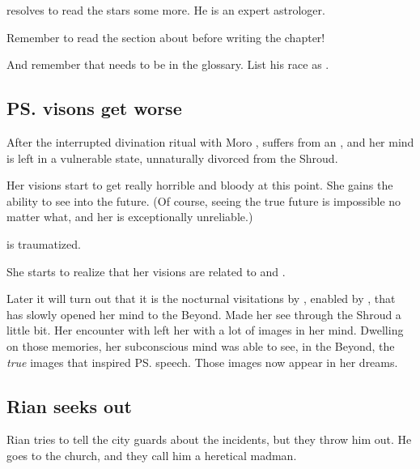 \Nasshikerr{} resolves to read the stars some more. 
He is an expert astrologer. 

Remember to read the section about  before writing the chapter!

And remember that \Nasshikerr{} needs to be in the glossary. 
List his race as \quo{\Taortha}. 











\subsection{\ps{\Tiroco} visons get worse}
After the interrupted divination ritual with Moro \Cobrel, \Tiroco{} suffers from an , and her mind is left in a vulnerable state, unnaturally divorced from the Shroud. 

Her visions start to get really horrible and bloody at this point. She gains the ability to see into the future. (Of course, seeing the true future is impossible no matter what, and her  is exceptionally unreliable.)


\Tiroco{} is traumatized.

She starts to realize that her visions are related to \Icor{} and \Psyrex.

Later it will turn out that it is the nocturnal visitations by \Icor, enabled by \Psyrex, that has slowly opened her mind to the Beyond. 
Made her see through the Shroud a little bit. 
Her encounter with \Uswa{} left her with a lot of images in her mind. 
Dwelling on those memories, her subconscious mind was able to see, in the Beyond, the \emph{true} images that inspired \ps{\Uswa} speech. 
Those images now appear in her dreams. 







\subsection{Rian seeks out \Tiroco}
Rian tries to tell the city guards about the incidents, but they throw him out. He goes to the church, and they call him a heretical madman. 


